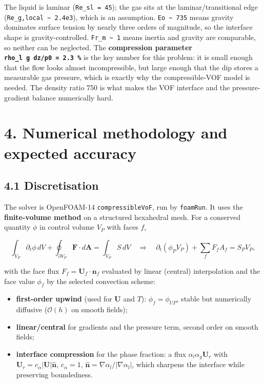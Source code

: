 \documentclass[11pt,english]{article}
\providecommand{\tightlist}{%
  \setlength{\itemsep}{0pt}\setlength{\parskip}{0pt}}
\begin{document}
The liquid is laminar (\texttt{Re\_sl\ =\ 45}); the gas sits at the
laminar/transitional edge
(\texttt{Re\_g,local\ \textasciitilde{}\ 2.4e3}), which is an
assumption. \texttt{Eo\ \textasciitilde{}\ 735} means gravity dominates
surface tension by nearly three orders of magnitude, so the interface
shape is gravity-controlled.
\texttt{Fr\_m\ \textasciitilde{}\ 1} means inertia and
gravity are comparable, so neither can be neglected. The
\textbf{compression parameter \texttt{rho\_l\ g\ dz/p0\ =\ 2.3\ \%}} is
the key number for this problem: it is small enough that the flow looks
almost incompressible, but large enough that the dip stores a measurable
gas pressure, which is exactly why the compressible-VOF model is
needed. The density ratio 750 is what makes the VOF interface and the
pressure-gradient balance numerically hard.

\section{4. Numerical methodology and expected accuracy}\label{numerical-methodology-and-expected-accuracy}

\subsection{4.1 Discretisation}\label{discretisation}

The solver is OpenFOAM-14 \texttt{compressibleVoF}, run by
\texttt{foamRun}. It uses the \textbf{finite-volume method} on a
structured hexahedral mesh. For a conserved quantity \(\phi\) in control
volume \(V_P\) with faces \(f\),

\[
\int_{V_P}\partial_t\phi\,dV + \oint_{\partial V_P}\mathbf F\cdot d\mathbf A
= \int_{V_P}S\,dV
\quad\Longrightarrow\quad
\partial_t(\phi_P V_P) + \sum_f F_f A_f = S_P V_P ,
\]

with the face flux \(F_f = \mathbf U_f\cdot\mathbf n_f\) evaluated by
linear (central) interpolation and the face value \(\phi_f\) by the
selected convection scheme:

\begin{itemize}
\tightlist
\item
  \textbf{first-order upwind} (used for \(\mathbf U\) and \(T\)):
  \(\phi_f = \phi_{UP}\), stable but numerically diffusive
  (\(\mathcal O(h)\) on smooth fields);
\item
  \textbf{linear/central} for gradients and the pressure term, second
  order on smooth fields;
\item
  \textbf{interface compression} for the phase fraction: a flux
  \(\alpha_l\alpha_g\mathbf U_r\) with
  \(\mathbf U_r = c_\alpha|\mathbf U|\hat{\mathbf n}\), \(c_\alpha=1\),
  \(\hat{\mathbf n}=\nabla\alpha_l/|\nabla\alpha_l|\), which sharpens
  the interface while preserving boundedness.
\end{itemize}
\end{document}
